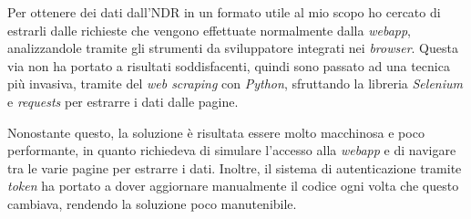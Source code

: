 Per ottenere dei dati dall'NDR in un formato utile al mio scopo ho cercato di estrarli dalle richieste che vengono effettuate normalmente dalla \emph{webapp}, analizzandole tramite gli strumenti da sviluppatore integrati nei \emph{browser}. Questa via non ha portato a risultati soddisfacenti, quindi sono passato ad una tecnica più invasiva, tramite del \emph{web scraping} con \emph{Python}, sfruttando la libreria \emph{Selenium} e \emph{requests} per estrarre i dati dalle pagine.

Nonostante questo, la soluzione è risultata essere molto macchinosa e poco performante, in quanto richiedeva di simulare l'accesso alla \emph{webapp} e di navigare tra le varie pagine per estrarre i dati. Inoltre, il sistema di autenticazione tramite \emph{token} ha portato a dover aggiornare manualmente il codice ogni volta che questo cambiava, rendendo la soluzione poco manutenibile.